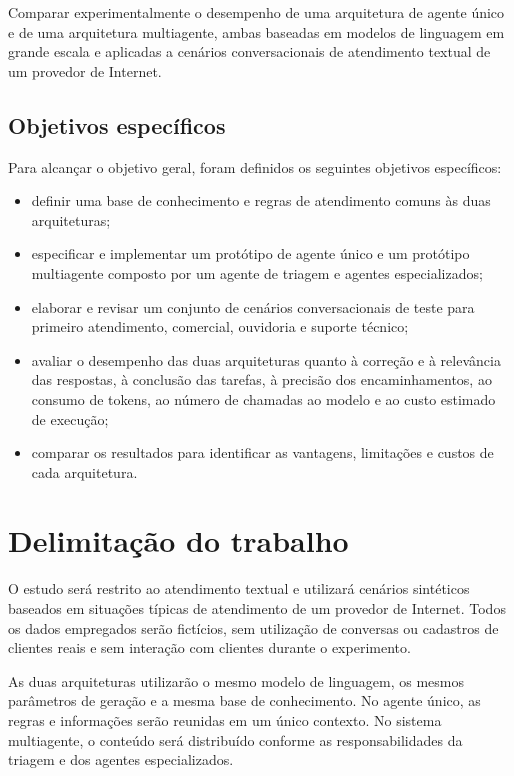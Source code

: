 Comparar experimentalmente o desempenho de uma arquitetura de agente único e de uma arquitetura multiagente, ambas baseadas em modelos de linguagem em grande escala e aplicadas a cenários conversacionais de atendimento textual de um provedor de Internet.

\subsection{Objetivos específicos}\label{subsec:objetivos-especificos}

Para alcançar o objetivo geral, foram definidos os seguintes objetivos específicos:

\begin{itemize}
    \item definir uma base de conhecimento e regras de atendimento comuns às duas arquiteturas;

    \item especificar e implementar um protótipo de agente único e um protótipo multiagente composto por um agente de triagem e agentes especializados;

    \item elaborar e revisar um conjunto de cenários conversacionais de teste para primeiro atendimento, comercial, ouvidoria e suporte técnico;

    \item avaliar o desempenho das duas arquiteturas quanto à correção e à relevância das respostas, à conclusão das tarefas, à precisão dos encaminhamentos, ao consumo de tokens, ao número de chamadas ao modelo e ao custo estimado de execução;

    \item comparar os resultados para identificar as vantagens, limitações e custos de cada arquitetura.
\end{itemize}

\section{Delimitação do trabalho}\label{sec:delimitacao}

O estudo será restrito ao atendimento textual e utilizará
cenários sintéticos baseados em situações típicas de atendimento
de um provedor de Internet. Todos os dados empregados serão
fictícios, sem utilização de conversas ou cadastros de clientes
reais e sem interação com clientes durante o experimento.

As duas arquiteturas utilizarão o mesmo modelo de linguagem, os mesmos parâmetros de geração e a mesma base de conhecimento. No agente único, as regras e informações serão reunidas em um único contexto. No sistema multiagente, o conteúdo será distribuído conforme as responsabilidades da triagem e dos agentes especializados.

